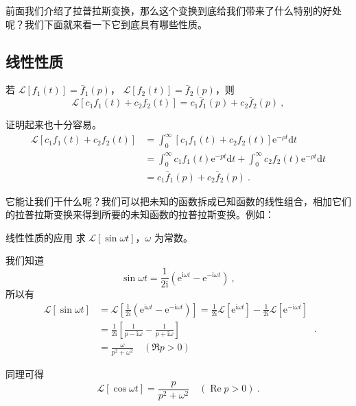

前面我们介绍了拉普拉斯变换，那么这个变换到底给我们带来了什么特别的好处呢？我们下面就来看一下它到底具有哪些性质。

\subsection{线性性质}


若 $\mathscr L[f_1(t)] = \bar f_1(p)$， $\mathscr L[f_2(t)] = \bar f_2(p)$，则
\begin{equation}
\mathscr L[c_1f_1(t)+c_2f_2(t)] = c_1\bar f_1(p) + c_2\bar f_2(p)~,
\end{equation}

证明起来也十分容易。
\begin{equation}
\begin{aligned} \mathscr L[c_{1} f_{1}(t)+c_{2} f_{2}(t)] & = \int_{0}^{\infty}\left[c_{1} f_{1}(t)+c_{2} f_{2}(t)\right] \mathrm{e}^{-\rho t} \mathrm{d} t \\ &=\int_{0}^{\infty} c_{1} f_{1}(t) \mathrm{e}^{-p t} \mathrm{d} t+\int_{0}^{\infty} c_{2} f_{2}(t) \mathrm{e}^{-\rho t} \mathrm{d} t \\ &=c_{1} \bar{f}_{1}(p)+c_{2} \bar{f}_{2}(p) ~.\end{aligned}
\end{equation}

它能让我们干什么呢？我们可以把未知的函数拆成已知函数的线性组合，相加它们的拉普拉斯变换来得到所要的未知函数的拉普拉斯变换。例如：
\begin{example}{线性性质的应用}
求 $\mathscr L[\sin \omega t]$，$\omega$ 为常数。

我们知道
\begin{equation}
\sin \omega t=\frac{1}{2 \mathrm{i}}\left(\mathrm{e}^{\mathrm{i} \omega t}-\mathrm{e}^{-\mathrm{i} \omega t}\right)~,
\end{equation}
所以有
\begin{equation}
\begin{aligned} \mathscr{L}[\sin \omega t] &=\mathscr{L}\left[\frac{1}{2 \mathrm{i}}\left(\mathrm{e}^{\mathrm{i} \omega t}-\mathrm{e}^{-\mathrm{i} \omega t}\right)\right]=\frac{1}{2 \mathrm{i}} \mathscr{L}\left[\mathrm{e}^{\mathrm{i} \omega t}\right]-\frac{1}{2 \mathrm{i}}\mathscr{L}\left[\mathrm{e}^{-\mathrm{i} \omega t}\right] \\ &=\frac{1}{2 \mathrm{i}}\left[\frac{1}{p-\mathrm{i} \omega}-\frac{1}{p+\mathrm{i} \omega}\right] \\ &=\frac{\omega}{p^{2}+\omega^{2}} \quad(\Re p>0) \end{aligned}~.
\end{equation}

同理可得
\begin{equation}
\mathscr{L}[\cos \omega t]=\frac{p}{p^{2}+\omega^{2}} \quad(\operatorname{Re} p>0)~.
\end{equation}
\end{example}

